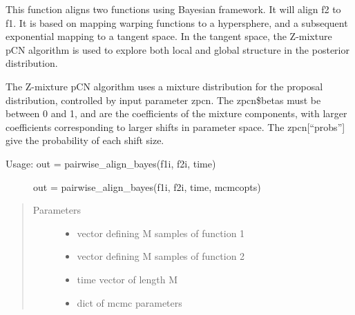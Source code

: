 \documentclass[letterpaper,10pt,english]{sphinxmanual}
\begin{document}
\begin{fulllineitems}
\label{\detokenize{time_warping:time_warping.pairwise_align_bayes}}
This function aligns two functions using Bayesian framework. It will align
f2 to f1. It is based on mapping warping functions to a hypersphere, and a
subsequent exponential mapping to a tangent space. In the tangent space,
the Z-mixture pCN algorithm is used to explore both local and global
structure in the posterior distribution.

The Z-mixture pCN algorithm uses a mixture distribution for the proposal
distribution, controlled by input parameter zpcn. The zpcn\$betas must be
between 0 and 1, and are the coefficients of the mixture components, with
larger coefficients corresponding to larger shifts in parameter space. The
zpcn{[}“probs”{]} give the probability of each shift size.
\begin{description}
\item[{Usage:  out = pairwise\_align\_bayes(f1i, f2i, time)}] \leavevmode
out = pairwise\_align\_bayes(f1i, f2i, time, mcmcopts)

\end{description}
\begin{quote}\begin{description}
\item[{Parameters}] \leavevmode\begin{itemize}
\item {} 
 \textendash{} vector defining M samples of function 1

\item {} 
 \textendash{} vector defining M samples of function 2

\item {} 
 \textendash{} time vector of length M

\item {} 
 \textendash{} dict of mcmc parameters

\end{itemize}

\end{description}\end{quote}


\end{fulllineitems}
\end{document}
